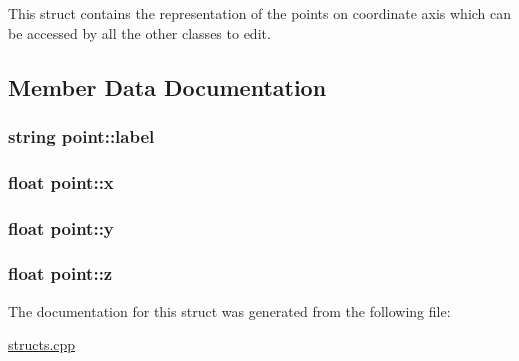 This struct contains the representation of the points on coordinate axis which can be accessed by all the other classes to edit. 

\subsection{Member Data Documentation}
\subsubsection[{\texorpdfstring{label}{label}}]{\setlength{\rightskip}{0pt plus 5cm}string point\+::label}\hypertarget{structpoint_aac98b52176e98d5ae6ab04ff1351fb14}{}\label{structpoint_aac98b52176e98d5ae6ab04ff1351fb14}
\subsubsection[{\texorpdfstring{x}{x}}]{\setlength{\rightskip}{0pt plus 5cm}float point\+::x}\hypertarget{structpoint_a8293fd2de3ce739deb6d53691fd21fcf}{}\label{structpoint_a8293fd2de3ce739deb6d53691fd21fcf}
\subsubsection[{\texorpdfstring{y}{y}}]{\setlength{\rightskip}{0pt plus 5cm}float point\+::y}\hypertarget{structpoint_a616ad85a2096d1566f5971666bbc3b3f}{}\label{structpoint_a616ad85a2096d1566f5971666bbc3b3f}
\subsubsection[{\texorpdfstring{z}{z}}]{\setlength{\rightskip}{0pt plus 5cm}float point\+::z}\hypertarget{structpoint_a3c15cf62431e51a4d9432ca40b3b04f5}{}\label{structpoint_a3c15cf62431e51a4d9432ca40b3b04f5}


The documentation for this struct was generated from the following file\+:\begin{DoxyCompactItemize}
\item 
\hyperlink{structs_8cpp}{structs.\+cpp}\end{DoxyCompactItemize}
